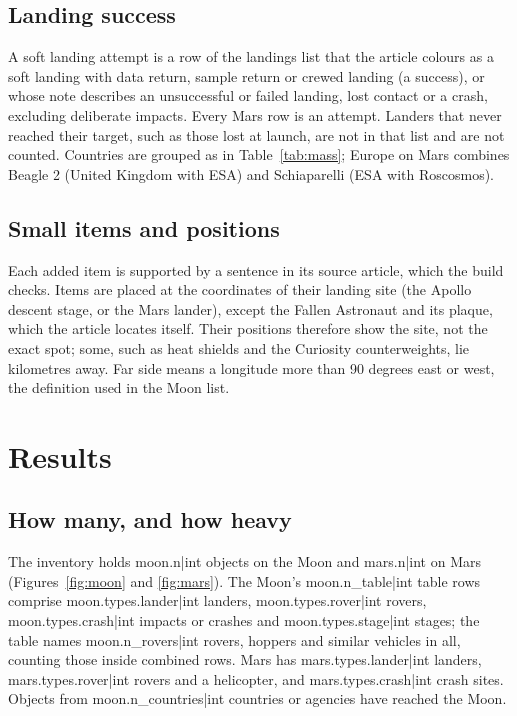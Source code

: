 \documentclass[11pt,a4paper]{article}
\begin{document}
\subsection{Landing success}
A soft landing attempt is a row of the landings list that the article colours as a soft landing with data return, sample return or crewed landing (a success), or whose note describes an unsuccessful or failed landing, lost contact or a crash, excluding deliberate impacts. Every Mars row is an attempt. Landers that never reached their target, such as those lost at launch, are not in that list and are not counted. Countries are grouped as in Table~\ref{tab:mass}; Europe on Mars combines Beagle 2 (United Kingdom with ESA) and Schiaparelli (ESA with Roscosmos).

\subsection{Small items and positions}
Each added item is supported by a sentence in its source article, which the build checks. Items are placed at the coordinates of their landing site (the Apollo descent stage, or the Mars lander), except the Fallen Astronaut and its plaque, which the article locates itself. Their positions therefore show the site, not the exact spot; some, such as heat shields and the Curiosity counterweights, lie kilometres away. Far side means a longitude more than 90 degrees east or west, the definition used in the Moon list.

\section{Results}
\subsection{How many, and how heavy}
The inventory holds {{moon.n|int}} objects on the Moon and {{mars.n|int}} on Mars (Figures~\ref{fig:moon} and \ref{fig:mars}). The Moon's {{moon.n_table|int}} table rows comprise {{moon.types.lander|int}} landers, {{moon.types.rover|int}} rovers, {{moon.types.crash|int}} impacts or crashes and {{moon.types.stage|int}} stages; the table names {{moon.n_rovers|int}} rovers, hoppers and similar vehicles in all, counting those inside combined rows. Mars has {{mars.types.lander|int}} landers, {{mars.types.rover|int}} rovers and a helicopter, and {{mars.types.crash|int}} crash sites. Objects from {{moon.n_countries|int}} countries or agencies have reached the Moon.
\end{document}
